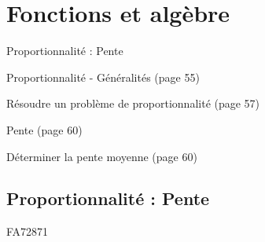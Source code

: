 \documentclass[a4paper,11pt]{report}
\begin{document}
\newcommand{\chapterName}{Fonctions et algèbre}
\newcommand{\serieName}{Proportionnalité : Pente}

\chapter*{\chapterName}
\thispagestyle{empty}

\begin{amL}{\serieName}{
\item Proportionnalité - Généralités (page 55)
\item Résoudre un problème de proportionnalité (page 57)
\item Pente (page 60)
\item Déterminer la pente moyenne (page 60)
}\end{amL}

\section*{\serieName}
\setcounter{page}{1}



\begin{exol}{FA72}{87}{1} %
\end{exol}
\end{document}
